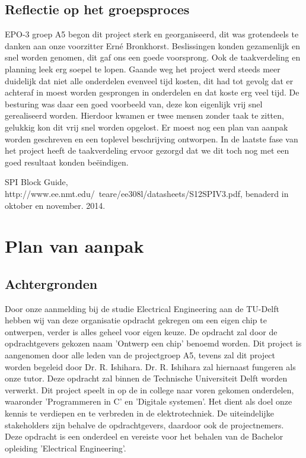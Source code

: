 \documentclass[oneside,dutch]{tudelft-report}
\begin{document}
\section{Reflectie op het groepsproces}
EPO-3 groep A5 begon dit project sterk en georganiseerd, dit was grotendeels te danken aan onze voorzitter Erné Bronkhorst. Beslissingen konden gezamenlijk en snel worden genomen, dit gaf ons een goede voorsprong. Ook de taakverdeling en planning leek erg soepel te lopen. Gaande weg het project werd steeds meer duidelijk dat niet alle onderdelen evenveel tijd kosten, dit had tot gevolg dat er achteraf in moest worden gesprongen in onderdelen en dat koste erg veel tijd. De besturing was daar een goed voorbeeld van, deze kon eigenlijk vrij snel gerealiseerd worden. Hierdoor kwamen er twee mensen zonder taak te zitten, gelukkig kon dit vrij snel worden opgelost. Er moest nog een plan van aanpak worden geschreven en een toplevel beschrijving ontworpen. In de laatste fase van het project heeft de taakverdeling ervoor gezorgd dat we dit toch nog met een goed resultaat konden beëindigen. 

 \begin{thebibliography}{1}

   SPI Block Guide, http://www.ee.nmt.edu/~teare/ee308l/datasheets/S12SPIV3.pdf, benaderd in oktober en november. 2014.

  \end{thebibliography}

\appendix

\chapter{Plan van aanpak}
\section{Achtergronden}
Door onze aanmelding bij de studie Electrical Engineering aan de TU-Delft hebben wij van deze organisatie opdracht gekregen om een eigen chip te ontwerpen, verder is alles geheel voor eigen keuze. De opdracht zal door de opdrachtgevers gekozen naam 'Ontwerp een chip' benoemd worden. Dit project is aangenomen door alle leden van de projectgroep A5, tevens zal dit project worden begeleid door Dr. R. Ishihara. Dr. R. Ishihara zal hiernaast fungeren als onze tutor. Deze opdracht zal binnen de Technische Universiteit Delft worden verwerkt. Dit project speelt in op de in college naar voren gekomen onderdelen, waaronder 'Programmeren in C' en 'Digitale systemen'. Het dient als doel onze kennis te verdiepen en te verbreden in de elektrotechniek. De uiteindelijke stakeholders zijn behalve de opdrachtgevers, daardoor ook de projectnemers. Deze opdracht is een onderdeel en vereiste voor het behalen van de Bachelor opleiding 'Electrical Engineering'.
\end{document}
